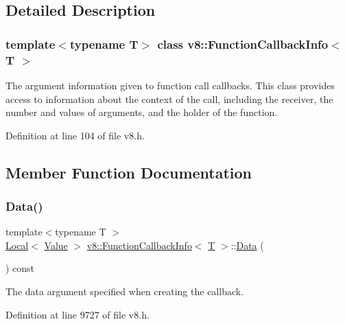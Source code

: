 \subsection{Detailed Description}
\subsubsection*{template$<$typename T$>$\newline
class v8\+::\+Function\+Callback\+Info$<$ T $>$}

The argument information given to function call callbacks. This class provides access to information about the context of the call, including the receiver, the number and values of arguments, and the holder of the function. 

Definition at line 104 of file v8.\+h.



\subsection{Member Function Documentation}
\mbox{\label{classv8_1_1FunctionCallbackInfo_ab0ebfc2ea43af2fdfc3d085272bf499f}} 
\subsubsection{\texorpdfstring{Data()}{Data()}}
{\footnotesize\ttfamily template$<$typename T $>$ \\
\mbox{\hyperlink{classv8_1_1Local}{Local}}$<$ \mbox{\hyperlink{classv8_1_1Value}{Value}} $>$ \mbox{\hyperlink{classv8_1_1FunctionCallbackInfo}{v8\+::\+Function\+Callback\+Info}}$<$ \mbox{\hyperlink{classv8_1_1internal_1_1torque_1_1T}{T}} $>$\+::\mbox{\hyperlink{classv8_1_1Data}{Data}} (\begin{DoxyParamCaption}{ }\end{DoxyParamCaption}) const}

The data argument specified when creating the callback. 

Definition at line 9727 of file v8.\+h.

\mbox{\label{classv8_1_1FunctionCallbackInfo_a7eee713a6f95d5707ce788861754682f}} 
